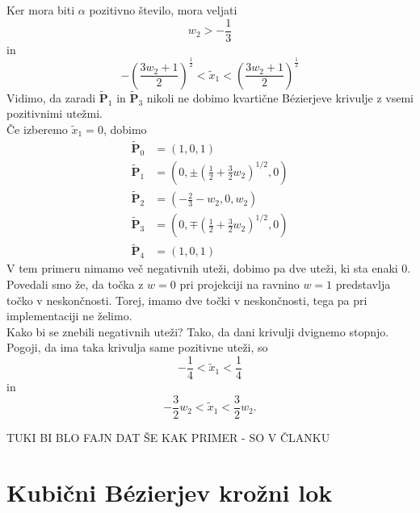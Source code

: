 \documentclass[a4paper,11pt]{article}
\theoremstyle{definition}
\theoremstyle{plain}
\begin{document}
Ker mora biti $\alpha$ pozitivno število, mora veljati
$$w_2>-\frac{1}{3}$$
in
$$-\left(\frac{3w_2+1}{2}\right)^{\frac{1}{2}}<\tilde{x}_1<\left(\frac{3w_2+1}{2}\right)^{\frac{1}{2}}$$
Vidimo, da zaradi $\boldsymbol{\tilde{P}}_1$ in $\boldsymbol{\tilde{P}}_3$ nikoli ne dobimo kvartične B\'ezierjeve krivulje z vsemi pozitivnimi utežmi. \\
Če izberemo $\tilde{x}_1=0$, dobimo  
\begin{align*}
\boldsymbol{\tilde{P}}_0 &= (1,0,1) \\
\boldsymbol{\tilde{P}}_1 &= (0,\pm (\frac{1}{2}+\frac{3}{2}w_2)^{1/2},0) \\
\boldsymbol{\tilde{P}}_2 &= (-\frac{2}{3}-w_2,0,w_2) \\
\boldsymbol{\tilde{P}}_3 &= (0,\mp(\frac{1}{2}+\frac{3}{2}w_2)^{1/2},0) \\
\boldsymbol{\tilde{P}}_4 &= (1,0,1)
\end{align*}
V tem primeru nimamo več negativnih uteži, dobimo pa dve uteži, ki sta enaki $0$. Povedali smo že, da točka z $w=0$ pri projekciji na ravnino $w=1$ predstavlja točko v neskončnosti. Torej, imamo dve točki v neskončnosti, tega pa pri implementaciji ne želimo. \\
Kako bi se znebili negativnih uteži? Tako, da dani krivulji dvignemo stopnjo. \\%
Pogoji, da ima taka krivulja same pozitivne uteži, so
$$-\frac{1}{4}<\tilde{x}_1<\frac{1}{4}$$
in
$$-\frac{3}{2}w_2<\tilde{x}_1<\frac{3}{2}w_2.$$

TUKI BI BLO FAJN DAT ŠE KAK PRIMER - SO V ČLANKU


\section{Kubični B\'ezierjev krožni lok}
\end{document}
